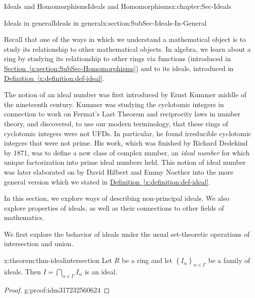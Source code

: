 \documentclass[oneside,10pt,]{book}
\newcommand{\xreffont}{\relax}
\numberwithin{equation}{section}
\newcommand{\set}[1]{\left\{ {#1} \right\}}
\begin{document}
\begin{chapterptx}{Ideals and Homomorphisms}{}{Ideals and Homomorphisms}{}{}{x:chapter:Sec-Ideals}
%
%
\typeout{************************************************}
\typeout{************************************************}
%
\begin{sectionptx}{Ideals in general}{}{Ideals in general}{}{}{x:section:SubSec-Ideals-In-General}
\begin{introduction}{}%
Recall that one of the ways in which we understand a mathematical object is to study its relationship to other mathematical objects. In algebra, we learn about a ring by studying its relationship to other rings via functions (introduced in \hyperref[x:section:SubSec-Homomorphisms]{Section~{\xreffont\ref{x:section:SubSec-Homomorphisms}}}) and to its ideals, introduced in \hyperref[x:definition:def-ideal]{Definition~{\xreffont\ref{x:definition:def-ideal}}}.%
\par
The notion of an ideal number was first introduced by Ernst Kummer middle of the nineteenth century. Kummer was studying the cyclotomic integers in connection to work on Fermat's Last Theorem and reciprocity laws in number theory, and discovered, to use our modern terminology, that these rings of cyclotomic integers were not UFDs. In particular, he found irreducible cyclotomic integers that were not prime. His work, which was finished by Richard Dedekind by 1871, was to define a new class of complex number, an \emph{ideal number} for which unique factorization into prime ideal numbers held. This notion of ideal number was later elaborated on by David Hilbert and Emmy Noether into the more general version which we stated in \hyperref[x:definition:def-ideal]{Definition~{\xreffont\ref{x:definition:def-ideal}}}.%
\par
In this section, we explore ways of describing non-principal ideals. We also explore properties of ideals, as well as their connections to other fields of mathematics.%
\end{introduction}%
We first explore the behavior of ideals under the usual set-theoretic operations of intersection and union.%
\begin{theorem}{}{}{x:theorem:thm-idealintersection}%
Let \(R\) be a ring and let \(\set{I_{\alpha}}_{\alpha\in \Gamma}\) be a family of ideals. Then \(I = \bigcap\limits_{\alpha\in \Gamma} I_\alpha\) is an ideal.%
\end{theorem}
\begin{proof}{}{g:proof:idm317232560624}

\end{proof}
\end{sectionptx}
\end{chapterptx}
\end{document}
